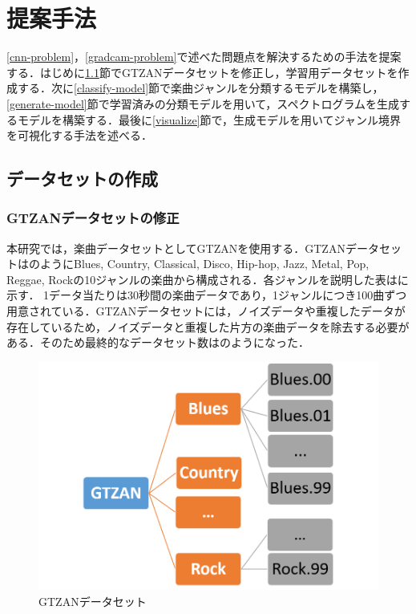 \chapter{提案手法}\label{proposed}
\ref{cnn-problem}，\ref{gradcam-problem}で述べた問題点を解決するための手法を提案する．はじめに\ref{makedataset}節でGTZANデータセットを修正し，学習用データセットを作成する．次に\ref{classify-model}節で楽曲ジャンルを分類するモデルを構築し，\ref{generate-model}節で学習済みの分類モデルを用いて，スペクトログラムを生成するモデルを構築する．最後に\ref{visualize}節で，生成モデルを用いてジャンル境界を可視化する手法を述べる．

\section{データセットの作成}\label{makedataset}

\subsection{GTZANデータセットの修正}
本研究では，楽曲データセットとしてGTZANを使用する．GTZANデータセットはのようにBlues, Country, Classical, Disco, Hip-hop, Jazz, Metal, Pop, Reggae, Rockの10ジャンルの楽曲から構成される．各ジャンルを説明した表はに示す\cite{genres}．
1データ当たりは30秒間の楽曲データであり，1ジャンルにつき100曲ずつ用意されている．GTZANデータセットには，ノイズデータや重複したデータが存在しているため，ノイズデータと重複した片方の楽曲データを除去する必要がある\cite{gtzanissue}．そのため最終的なデータセット数はのようになった．
\begin{figure}[htbp]
	\begin{center}
		\includegraphics[scale=0.461]{./images/dataset/gtzan.png}
		\caption{GTZANデータセット}
		\label{fig:gtzan}
	\end{center}
\end{figure}

